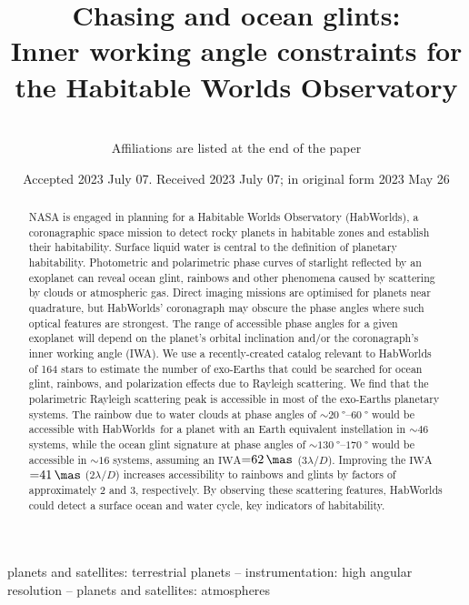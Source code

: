 \documentclass[usenatbib]{mnras}
\title{Chasing \rainbows and ocean glints:\\ Inner working angle constraints for the Habitable Worlds Observatory}
\author[Sophia R. Vaughan et al.]{%
    
    \newauthor 
    \\%
    Affiliations are listed at the end of the paper
}
\date{Accepted 2023 July 07. Received 2023 July 07; in original form 2023 May 26}
\newcommand{\IWA}{\ensuremath{\mathrm{IWA}}\xspace}
\newcommand{\HWO}{HabWorlds\xspace}
\begin{document}
 

\maketitle

\begin{abstract}
NASA is engaged in planning for a Habitable Worlds Observatory (\HWO), a coronagraphic space mission to detect rocky planets in habitable zones and establish their habitability. 
%
Surface liquid water is central to the definition of planetary habitability.
%
Photometric and polarimetric phase curves of starlight reflected by an exoplanet can reveal ocean glint, rainbows and other phenomena caused by scattering by clouds or atmospheric gas.
%
Direct imaging missions are optimised for planets near quadrature, but \HWO' coronagraph may obscure the phase angles where such optical features are strongest. 
%
The range of accessible phase angles for a given exoplanet will depend on the planet's orbital inclination and/or the coronagraph's inner working angle (IWA). 
%
We use a recently-created catalog relevant to HabWorlds of 164 stars to estimate the number of exo-Earths that could be searched for ocean glint, rainbows, and polarization effects due to Rayleigh scattering. 
%
We find that the polarimetric Rayleigh scattering peak is accessible in most of the exo-Earths planetary systems.
%
The rainbow due to water clouds at phase angles of ${\sim}\qtyrange{20}{60}{\degree}$ would be accessible with \HWO\ for a planet with an Earth equivalent instellation in ${\sim}\num{46}$ systems, while the ocean glint signature at phase angles of ${\sim}\qtyrange{130}{170}{\degree}$ would be accessible in ${\sim}\num{16}$ systems, assuming an \IWA${=}\qty{62}{\mas}$ ($3\lambda/D$).
%
Improving the \IWA${=}\qty{41}{\mas}$ ($2\lambda/D$) increases accessibility to rainbows and glints by factors of approximately 2 and 3, respectively.
%
By observing these scattering features, \HWO could detect a surface ocean and water cycle, key indicators of habitability.
\end{abstract}

\begin{keywords}
    planets and satellites: terrestrial planets -- 
    instrumentation: high angular resolution -- 
    planets and satellites: atmospheres
\end{keywords}

\end{document}
